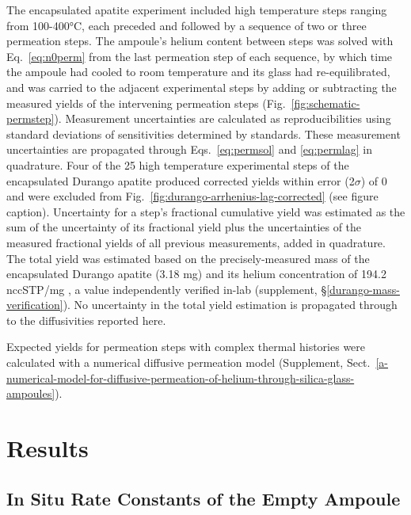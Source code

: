 The encapsulated apatite experiment included high temperature steps ranging from 100-400°C, each preceded and followed by a sequence of two or three permeation steps. The ampoule's helium content between steps was solved with Eq.~\eqref{eq:n0perm} from the last permeation step of each sequence, by which time the ampoule had cooled to room temperature and its glass had re-equilibrated, and was carried to the adjacent experimental steps by adding or subtracting the measured yields of the intervening permeation steps (Fig.~\ref{fig:schematic-permstep}). Measurement uncertainties are calculated as reproducibilities using standard deviations of sensitivities determined by standards. These measurement uncertainties are propagated through Eqs.~\eqref{eq:permsol} and \eqref{eq:permlag} in quadrature. Four of the 25 high temperature experimental steps of the encapsulated Durango apatite produced corrected yields within error (2$\sigma$) of 0 and were excluded from Fig.~\ref{fig:durango-arrhenius-lag-corrected} (see figure caption). Uncertainty for a step's fractional cumulative yield was estimated as the sum of the uncertainty of its fractional yield plus the uncertainties of the measured fractional yields of all previous measurements, added in quadrature. The total yield was estimated based on the precisely-measured mass of the encapsulated Durango apatite (3.18 mg) and its helium concentration of 194.2 nccSTP/mg \citep{farley2000}, a value independently verified in-lab (supplement, \S\ref{durango-mass-verification}). No uncertainty in the total yield estimation is propagated through to the diffusivities reported here.

Expected yields for permeation steps with complex thermal histories were calculated with a numerical diffusive permeation model (Supplement, Sect.~\ref{a-numerical-model-for-diffusive-permeation-of-helium-through-silica-glass-ampoules}).

\section{Results}\label{results}

\subsection{In Situ Rate Constants of the Empty Ampoule}\label{sec:results-insitu}

